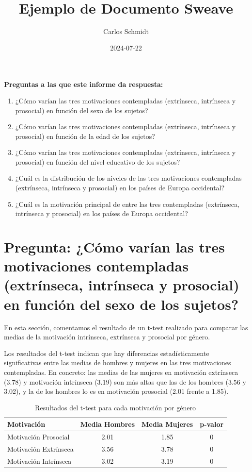 \documentclass{article}
\title{Ejemplo de Documento Sweave}
\author{Carlos Schmidt}
\date{2024-07-22}
\begin{document}


\maketitle

\textbf{Preguntas a las que este informe da respuesta:}
\begin{enumerate}
    \item ¿Cómo varían las tres motivaciones contempladas (extrínseca, intrínseca y prosocial) en función del sexo de los sujetos?
    \item ¿Cómo varían las tres motivaciones contempladas (extrínseca, intrínseca y prosocial) en función de la edad de los sujetos?
    \item ¿Cómo varían las tres motivaciones contempladas (extrínseca, intrínseca y prosocial) en función del nivel educativo de los sujetos?
    \item ¿Cuál es la distribución de los niveles de las tres motivaciones contempladas (extrínseca, intrínseca y prosocial) en los países de Europa occidental?
    \item ¿Cuál es la motivación principal de entre las tres contempladas (extrínseca, intrínseca y prosocial) en los países de Europa occidental?
\end{enumerate}





\section{Pregunta: ¿Cómo varían las tres motivaciones contempladas (extrínseca, intrínseca y prosocial) en función del sexo de los sujetos?
}

En esta sección, comentamos el resultado de un t-test realizado para comparar las medias de la motivación intrínseca, extrínseca y prosocial por género.


Los resultados del t-test indican que hay diferencias estadísticamente significativas entre las medias de hombres y mujeres en las tres motivaciones contempladas. En concreto: las medias de las mujeres en motivación extrínseca (3.78) y motivación intrínseca (3.19) son más altas que las de los hombres (3.56 y 3.02), y la de los hombres lo es en motivación prosocial (2.01 frente a 1.85).

\begin{table}[h!]
\centering
\caption{Resultados del t-test para cada motivación por género}
\begin{tabular}{lccc}
  \toprule
  \textbf{Motivación} & \textbf{Media Hombres} & \textbf{Media Mujeres} & \textbf{p-valor} \\
  \midrule
  Motivación Prosocial & 2.01 & 1.85 & 0 \\
  Motivación Extrínseca & 3.56 & 3.78 & 0 \\
  Motivación Intrínseca & 3.02 & 3.19 & 0 \\
  \bottomrule
\end{tabular}
\end{table}
\end{document}
